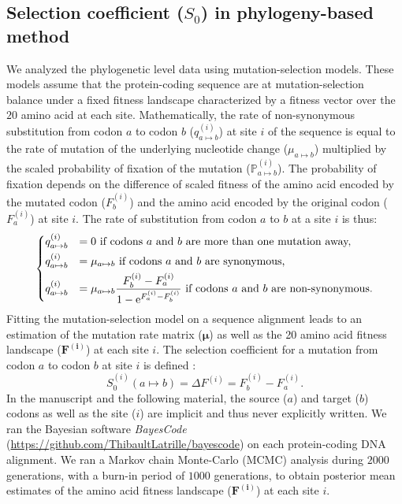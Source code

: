 \documentclass{article}
\newcommand{\UniDimArray}[1]{\bm{#1}}
\newcommand{\e}{\textrm{e}}
\newcommand{\proba}{\mathbb{P}}
\newcommand{\Sphy}{S_{0}}
\begin{document}
    \subsection{Selection coefficient ($\Sphy$) in phylogeny-based method}
    \label{subsec:s-phylogeny-method}

    We analyzed the phylogenetic level data using mutation-selection models.
    These models assume that the protein-coding sequence are at mutation-selection balance under a fixed fitness landscape characterized by a fitness vector over the $20$ amino acid at each site\cite{yang_mutationselection_2008, halpern_evolutionary_1998, rodrigue_mechanistic_2010}.
    Mathematically, the rate of non-synonymous substitution from codon $a$ to codon $b$ ($q_{a \mapsto b}^{(i)}$) at site $i$ of the sequence is equal to the rate of mutation of the underlying nucleotide change ($\mu_{a \mapsto b}$) multiplied by the scaled probability of fixation of the mutation ($\proba_{a \mapsto b}^{(i)}$).
    The probability of fixation depends on the difference of scaled fitness of the amino acid encoded by the mutated codon ($F_b^{(i)}$) and the amino acid encoded by the original codon ($F_a^{(i)}$) at site $i$\cite{wright_evolution_1931a, fisher_genetical_1930a}.
    The rate of substitution from codon $a$ to $b$ at a site $i$ is thus:
    \begin{equation}
        \begin{dcases}
            q_{a \mapsto b}^{(i)} & = 0 \text{ if codons $a$ and $b$ are more than one mutation away,} \\
            q_{a \mapsto b}^{(i)} & = \mu_{a \mapsto b} \text{ if codons $a$ and $b$ are synonymous,} \\
            q_{a \mapsto b}^{(i)} & = \mu_{a \mapsto b} \dfrac{F_b^{(i)} - F_a^{(i)}}{1 - \e^{F_a^{(i)} - F_b^{(i)}}} \text{ if codons $a$ and $b$ are non-synonymous}.
        \end{dcases}
    \end{equation}
    Fitting the mutation-selection model on a sequence alignment leads to an estimation of the mutation rate matrix ($\UniDimArray{\mu}$) as well as the 20 amino acid fitness landscape ($\UniDimArray{F^{(i)}}$) at each site $i$.
    The selection coefficient for a mutation from codon $a$ to codon $b$ at site $i$ is defined :
    \begin{equation}
        \Sphy^{(i)} (a \mapsto b) = \Delta F^{(i)} = F^{(i)}_{b} - F^{(i)}_{a}.
    \end{equation}
    In the manuscript and the following material, the source ($a$) and target ($b$) codons as well as the site ($i$) are implicit and thus never explicitly written.
    We ran the Bayesian software \textit{BayesCode} (\url{https://github.com/ThibaultLatrille/bayescode}) on each protein-coding DNA alignment\cite{rodrigue_bayesian_2021}.
    We ran a Markov chain Monte-Carlo (MCMC) analysis during $2000$ generations, with a burn-in period of $1000$ generations, to obtain posterior mean estimates of the amino acid fitness landscape ($\UniDimArray{F^{(i)}}$) at each site $i$\@.
\end{document}
